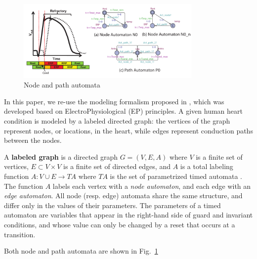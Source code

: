 \begin{figure}[!t]
	\centering
	\includegraphics[width=0.8\textwidth]{figs/init_abs.pdf}
	\caption{\small Node and path automata}
	\label{fig:nodepathTA}
\end{figure}
In this paper, we re-use the modeling formalism proposed in \cite{VHM_proc}, which was developed based on ElectroPhysiological (EP) principles.
A given human heart condition is modeled by a labeled directed graph: the vertices of the graph represent nodes, or locations, in the heart, while edges represent conduction paths between the nodes. 
\begin{defn}
	A \textbf{labeled graph} is a directed graph $G = (V,E,A)$ where 
	$V$ is a finite set of vertices, $E \subset V\times V$ is a finite set of directed edges,
	and $A$ is a total labeling function $A: V \cup E \rightarrow TA$
	where $TA$ is the set of parametrized timed automata \cite{timed_automata}.
	The function $A$ labels each vertex with a \emph{node automaton}, and each edge with an \emph{edge automaton}.
	All node (resp. edge) automata share the same structure, and differ only in the values of their parameters.
	The parameters of a timed automaton are variables that appear in the right-hand side of guard and invariant conditions, and whose value can only be changed by a reset that occurs at a transition.
		
	Both node and path automata are shown in Fig.~\ref{fig:nodepathTA}
\end{defn}


